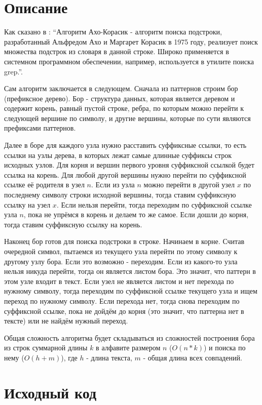 \section{Описание}

Как сказано в \cite{Aho-Korasik}: \enquote{Алгоритм Ахо-Корасик - алгоритм поиска подстроки, разработанный Альфредом Ахо и 
Маргарет Корасик в 1975 году, реализует поиск множества подстрок из словаря в данной строке. Широко применяется в системном 
программном обеспечении, например, используется в утилите поиска grep.}. 

Сам алгоритм заключается в следующем. Сначала из паттернов строим бор (префиксное дерево). Бор - структура данных, которая 
является деревом и содержит корень, равный пустой строке, ребра, по которым можно перейти к следующей вершине по символу, 
и другие вершины, которые по сути являются префиксами паттернов. 

Далее в боре для каждого узла нужно расставить суффиксные ссылки, то есть ссылки на узлы дерева, в которых лежат самые длинные 
суффиксы строк исходных узлов. Для корня и вершин первого уровня суффиксной ссылкой будет ссылка на корень. Для любой другой вершины
нужно перейти по суффиксной ссылке её родителя в узел $n$. Если из узла $n$ можно перейти в другой узел $x$ по последнему символу
строки исходной вершины, тогда ставим суффиксную ссылку на узел $x$. Если нельзя перейти, тогда переходим по суффиксной ссылке
узла $n$, пока не упрёмся в корень и делаем то же самое. Если дошли до корня, тогда ставим суффиксную ссылку на корень. 

Наконец бор готов для поиска подстроки в строке. Начинаем в корне. Считав очередной символ, пытаемся из текущего узла перейти
по этому символу к другому узлу бора. Если это возможно - переходим. Если из какого-то узла нельзя никуда перейти, тогда он 
является листом бора. Это значит, что паттерн в этом узле входит в текст. Если узел не является листом и нет перехода по 
нужному символу, тогда переходим по суффиксной ссылке текущего узла и ищем переход по нужному символу. Если перехода нет, 
тогда снова переходим по суффиксной ссылке, пока не дойдём до корня (это значит, что паттерна нет в тексте) или не найдём 
нужный переход.

Общая сложность алгоритма будет складываться из сложностей построения бора из строк суммарной длины $k$ в алфавите размером 
$n$ ($O(n * k)$) и поиска по нему ($O(h + m)$), где $h$ - длина текста, $m$ - общая длина всех совпадений. 
\pagebreak

\section{Исходный код}


